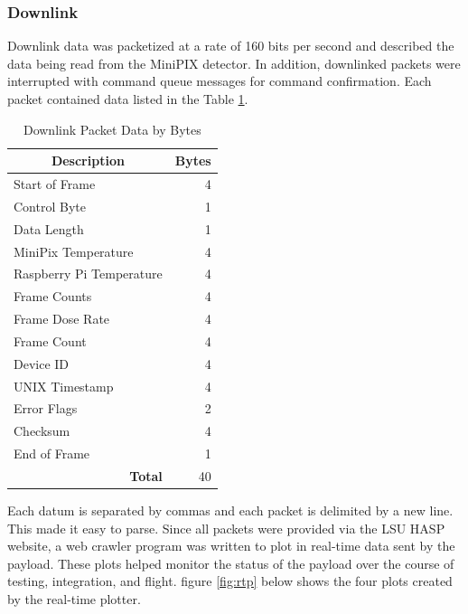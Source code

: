 \subsubsection{Downlink}
\label{sec:Downlink}
Downlink data was packetized at a rate of 160 bits per second and described the data being read from the MiniPIX detector. 
In addition, downlinked packets were interrupted with command queue messages for command confirmation.
Each packet contained data listed in the Table \ref{tab:packets}. 

\begin{table}[H]
\centering
\caption{Downlink Packet Data by Bytes}
\label{tab:packets}
\bigskip
\begin{tabular}{l|r}
\hline
\hline
\multicolumn{1}{c|}{\bf{Description}}				& \multicolumn{1}{c}{\bf{Bytes}}	\\
\hline
Start of Frame 						& 	4 			\\
\hline
Control Byte 						& 	1 			\\
\hline
Data Length 						& 	1 			\\
\hline
MiniPix Temperature 				&	4 			\\
\hline
Raspberry Pi Temperature 			& 	4 			\\
\hline
Frame Counts 						& 	4 			\\
\hline
Frame Dose Rate 					& 	4 			\\
\hline
Frame Count 						& 	4 			\\
\hline
Device ID 							& 	4 			\\
\hline
UNIX Timestamp 						& 	4 			\\
\hline
Error Flags							&	2 			\\
\hline
Checksum							& 	4			\\
\hline
End of Frame 						& 	1			\\
\hline
\multicolumn{1}{r|}{\bf{Total}}   	& 	40  		\\
\hline
\end{tabular}
\end{table}

Each datum is separated by commas and each packet is delimited by a new line. This made it easy to parse. Since all packets were provided 
via the LSU HASP website, a web crawler program was written to plot in real-time data sent by the payload. These plots helped monitor the 
status of the payload over the course of testing, integration, and flight. figure \ref{fig:rtp} below shows the four plots created by the 
real-time plotter. 


